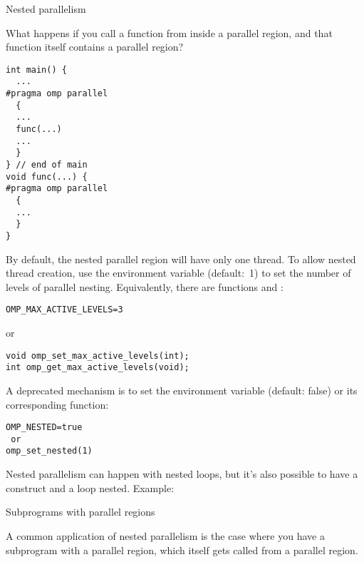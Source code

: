  {Nested parallelism}
\label{sec:omp-levels}

What happens if you call a function from inside a parallel region, and
that function itself contains a parallel region?
\begin{lstlisting}
int main() {
  ...
#pragma omp parallel
  {
  ...
  func(...)
  ...
  }
} // end of main
void func(...) {
#pragma omp parallel
  {
  ...
  }
}
\end{lstlisting}

By default, the nested parallel region will have only one thread.
To allow nested thread creation,
use the environment variable
 (default:~1)
to set the number of levels of parallel nesting.
Equivalently, there are functions
 and :
\begin{verbatim}
OMP_MAX_ACTIVE_LEVELS=3
\end{verbatim}
or
\begin{lstlisting}
void omp_set_max_active_levels(int);
int omp_get_max_active_levels(void);
\end{lstlisting}

\begin{remark}
  A deprecated mechanism is to set the environment variable
   (default: false)
  or its corresponding function:
\begin{verbatim}
OMP_NESTED=true
 or
omp_set_nested(1)
\end{verbatim}
\end{remark}

Nested parallelism can happen with nested loops,
but it's also possible to have a  construct
and a loop nested.
Example:

 {Subprograms with parallel regions}

A common application of nested parallelism is the case
where you have a subprogram with a parallel region,
which itself gets called from a parallel region.

